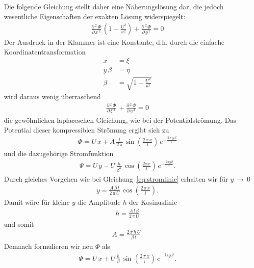 Die folgende Gleichung stellt daher eine Näherungslösung dar,
die jedoch wesentliche Eigenschaften der exakten Lösung widerspiegelt:
\begin{align}
    \frac{\partial\,^2\,\Phi}{\partial\,x\,^2}\,
    \left(1-\frac{U^2}{a^2}\right)
    +
    \frac{\partial\,^2\,\Phi}{\partial\,y\,^2}
    =
    0\label{eq:kompressible_stroemung}
\end{align}
Der Ausdruck in der Klammer ist eine Konstante, d.h.
durch die einfache Koordinatentransformation
\begin{align*}
    x 
    &=
    \xi \\
    y\,\beta
    &=
    \eta \\
    \beta
    &=
    \sqrt{1-\frac{U^2}{a^2}}
\end{align*}
wird daraus wenig überraschend
\begin{align*}
    \frac{\partial\,^2\,\Phi}{\partial\,\xi\,^2}\,
    +
    \frac{\partial\,^2\,\Phi}{\partial\,\eta\,^2}
    =
    0
\end{align*}
die gewöhnlichen laplaceschen Gleichung, wie
bei der Potentialströmung.
Das Potential dieser kompressiblen Strömung ergibt sich zu
\begin{align*}
    \Phi
    =
    U\,x + A\,\frac{l}{2\,\pi}\,\sin\left(\frac{2\,\pi\,x}{l}\right)
    \,e^{-\frac{2\,\pi\,y\,\beta}{l}}
\end{align*}
und die dazugehörige Stromfunktion
\begin{align*}
    \Psi
    =
    U\,y - U\,\frac{h}{\beta^2}\,\cos\left(\frac{2\pi x}{l}\right)
    \,e^{-\frac{2\pi y \beta}{l}}.
\end{align*}
Durch gleiches Vorgehen wie bei Gleichung~\eqref{eq:stromlinie}
erhalten wir für $y\,\to\,0$
\begin{align*}
    y
    =
    \frac{A\,\beta\,l}{2\,\pi\,U}\,
    \cos\left(\frac{2\,\pi\,x}{l}\right).
\end{align*}
Damit wäre für kleine $y$ die Amplitude $h$ der Kosinuslinie
\begin{align*}
    h
    =
    \frac{A\,l\,\beta}{2\,\pi\,U}
\end{align*}
und somit 
\begin{align*}
    A
    =
    \frac{2\,\pi\,h\,U}{\beta\,l}.
\end{align*}
Demnach formulieren wir neu $\Phi$ als
\begin{align*}
    \Phi
    =
    U\,x + U\,\frac{h}{\beta}\,\sin\left(\frac{2\,\pi\,x}{l}\right)
    \,e^{-\frac{2\,\pi\,y\,\beta}{l}}.
\end{align*}
